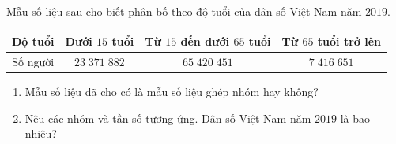 \begin{bt}%
	Mẫu số liệu sau cho biết phân bố theo độ tuổi của dân số Việt Nam năm $2019$.
	\begin{center}
		\begin{tabular}{|c|c|c|c|}
			\hline
			Độ tuổi&Dưới $15$ tuổi&Từ $15$ đến dưới $65$ tuổi&Từ $65$ tuổi trở lên\\
			\hline
			Số người& $23\;371\;882$&$65\;420\;451$&$7\;416\;651$\\
			\hline
		\end{tabular}
	\end{center}
	\begin{enumerate}
		\item Mẫu số liệu đã cho có là mẫu số liệu ghép nhóm hay không?
		\item Nêu các nhóm và tần số tương ứng. Dân số Việt Nam năm $2019$ là bao nhiêu?
	\end{enumerate}
\end{bt}

